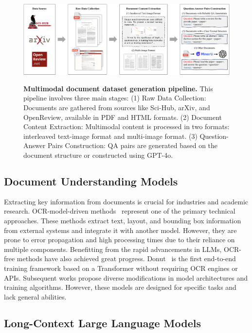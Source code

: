 \documentclass[10pt,twocolumn,letterpaper]{article}
\begin{document}
\begin{CJK}{UTF8}{gbsn}
\begin{figure}[t!]
    \centering
    {\includegraphics[width=\linewidth]{figure/data_engine.pdf}}
    \caption{
    \textbf{Multimodal document dataset generation pipeline.} 
    This pipeline involves three main stages: 
    (1) Raw Data Collection: Documents are gathered from sources like Sci-Hub, arXiv, and OpenReview, available in PDF and HTML formats. 
    (2) Document Content Extraction: Multimodal content is processed in two formats: interleaved text-image format and multi-image format. 
    (3) Question-Answer Pairs Construction: QA pairs are generated based on the document structure or constructed using GPT-4o.
    }
    \label{fig:data_pipeline}
    \vspace{-2mm}
\end{figure}


\subsection{Document Understanding Models}

Extracting key information from documents is crucial for industries and academic research.
OCR-model-driven methods~\cite{wang2023docllm,appalaraju2024docformerv2,bai2022wukong,tang2023unifying} represent one of the primary technical approaches. These methods extract text, layout, and bounding box information from external systems and integrate it with another model. However, they are prone to error propagation and high processing times due to their reliance on multiple components.
Benefitting from the rapid advancements in LLMs, OCR-free methods have also achieved great progress. Donut~\cite{kim2022ocr} is the first end-to-end training framework based on a Transformer without requiring OCR engines or APIs. 
Subsequent works \cite{wang2023towards,feng2023docpedia,ye2023ureader,wei2023vary,luo2024layoutllm} propose diverse modifications in model architectures and training algorithms.
However, these models are designed for specific tasks and lack general abilities.


\subsection{Long-Context Large Language Models}


\end{CJK}
\end{document}
